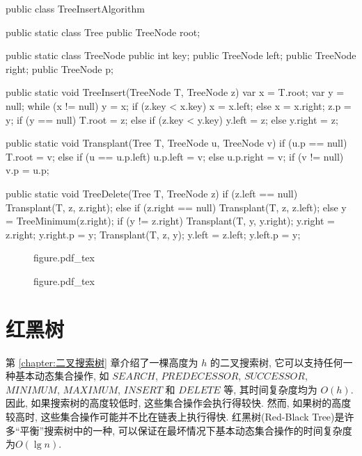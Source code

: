 \documentclass[oneside,10pt,fontset=none]{ctexbook}
\numberwithin{definition}{chapter}
\numberwithin{theorem}{chapter}
\numberwithin{lemma}{chapter}
\begin{document}
\begin{myjava}{}{}{}
public class TreeInsertAlgorithm {
    public static class Tree {
        public TreeNode root;
    }

    public static class TreeNode {
        public int key;
        public TreeNode left;
        public TreeNode right;
        public TreeNode p;
    }

    public static void TreeInsert(TreeNode T, TreeNode z) {
        var x = T.root;
        var y = null;
        while (x != null) {
            y = x;
            if (z.key < x.key)
                x = x.left;
            else
                x = x.right;
        }
        z.p = y;
        if (y == null)
            T.root = z;
        else if (z.key < y.key)
            y.left = z;
        else
            y.right = z;
    }

    public static void Transplant(Tree T, TreeNode u, TreeNode v) {
        if (u.p == null)
            T.root = v;
        else if (u == u.p.left)
            u.p.left = v;
        else
            u.p.right = v;
        if (v != null)
            v.p = u.p;
    }

    public static void TreeDelete(Tree T, TreeNode z) {
        if (z.left == null)
            Transplant(T, z, z.right);
        else if (z.right == null)
            Transplant(T, z, z.left);
        else {
            y = TreeMinimum(z.right);
            if (y != z.right) {
                Transplant(T, y, y.right);
                y.right = z.right;
                y.right.p = y;
            }
            Transplant(T, z, y);
            y.left = z.left;
            y.left.p = y;
        }
    }
}
\end{myjava}

\begin{figure}[htbp]
    \def\svgwidth{\columnwidth}
    {figure.pdf_tex}
\end{figure}

\begin{figure}[htbp]
    \def\svgwidth{\columnwidth}
    {figure.pdf_tex}
\end{figure}

\chapter{红黑树}

第 \ref{chapter:二叉搜索树} 章介绍了一棵高度为 $h$ 的二叉搜索树, 它可以支持任何一种基本动态集合操作, 如 $SEARCH$, $PREDECESSOR$, $SUCCESSOR$, $MINIMUM$, $MAXIMUM$, $INSERT$ 和 $DELETE$ 等, 其时间复杂度均为 $O(h)$. 因此, 如果搜索树的高度较低时, 这些集合操作会执行得较快. 然而, 如果树的高度较高时, 这些集合操作可能并不比在链表上执行得快. 红黑树(Red-Black Tree)是许多``平衡''搜索树中的一种, 可以保证在最坏情况下基本动态集合操作的时间复杂度为$O(\lg{n})$.
\end{document}
